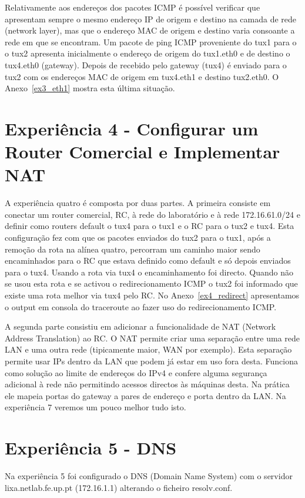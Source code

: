 \documentclass[11pt,a4paper,reqno]{report}
\numberwithin{equation}{section}
\begin{document}
Relativamente aos endereços dos pacotes ICMP é possível verificar que apresentam sempre o mesmo endereço IP de origem e destino na camada de rede (network layer), mas que o endereço MAC de origem e destino varia consoante a rede em que se encontram. Um pacote de ping ICMP proveniente do tux1 para o o tux2 apresenta inicialmente o endereço de origem do tux1.eth0 e de destino o tux4.eth0 (gateway). Depois de recebido pelo gateway (tux4) é enviado para o tux2 com os endereços MAC de origem em tux4.eth1 e destino tux2.eth0. O Anexo~\ref{ex3_eth1} mostra esta última situação.


\section{Experiência 4 - Configurar um Router Comercial e Implementar NAT}

A experiência quatro é composta por duas partes. A primeira consiste em conectar um router comercial, RC, à rede do laboratório e à rede 172.16.61.0/24 e definir como routers default o tux4 para o tux1 e o RC para o tux2 e tux4.
Esta configuração fez com que os pacotes enviados do tux2 para o tux1, após a remoção da rota na alínea quatro, percorram um caminho maior sendo encaminhados para o RC que estava definido como default e só depois enviados para o tux4. Usando a rota via tux4 o encaminhamento foi directo. Quando não se usou esta rota e se activou o redirecionamento ICMP o tux2 foi informado que existe uma rota melhor via tux4 pelo RC. No Anexo~\ref{ex4_redirect} apresentamos o output em consola do traceroute ao fazer uso do redirecionamento ICMP.

A segunda parte consistiu em adicionar a funcionalidade de NAT (Network Address Translation) ao RC.
O NAT permite criar uma separação entre uma rede LAN e uma outra rede (tipicamente maior, WAN por exemplo). Esta separação permite usar IPs dentro da LAN que podem já estar em uso fora desta. Funciona como solução ao limite de endereços do IPv4 e confere alguma segurança adicional à rede não permitindo acessos directos às máquinas desta. Na prática ele mapeia portas do gateway a pares de endereço e porta dentro da LAN. Na experiência 7 veremos um pouco melhor tudo isto.


\section{Experiência 5 - DNS}

Na experiência 5 foi configurado o DNS (Domain Name System) com o servidor lixa.netlab.fe.up.pt (172.16.1.1) alterando o ficheiro resolv.conf.
\end{document}
